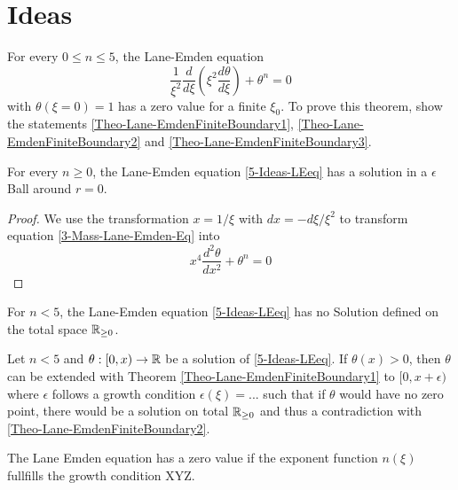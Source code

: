 \section{Ideas}
\begin{theorem}
	\label{Theo-Lane-EmdenFiniteBoundary}
	For every $0\leq n\leq5$, the Lane-Emden equation
	\begin{equation}
		\frac{1}{\xi^2}\frac{d}{d\xi}\left(\xi^2\frac{d\theta}{d\xi}\right)+\theta^n=0
		\label{5-Ideas-LEeq}
	\end{equation}
	with $\theta(\xi=0)=1$ has a zero value for a finite $\xi_0$. To prove this theorem, show the statements \ref{Theo-Lane-EmdenFiniteBoundary1}, 
	\ref{Theo-Lane-EmdenFiniteBoundary2} and \ref{Theo-Lane-EmdenFiniteBoundary3}.
\end{theorem}
\begin{theorem}
	\label{Theo-Lane-EmdenFiniteBoundary1}
	For every $n\geq0$, the Lane-Emden equation \ref{5-Ideas-LEeq} has a solution in a $\epsilon$ Ball around $r=0$.
\end{theorem}
\begin{proof}
	We use the transformation $x=1/\xi$ with $dx=-d\xi/\xi^2$ to transform equation \ref{3-Mass-Lane-Emden-Eq} into
	\begin{equation}
		x^4\frac{d^2\theta}{dx^2} + \theta^n=0
	\end{equation}

\end{proof}
\begin{theorem}
	\label{Theo-Lane-EmdenFiniteBoundary2}
	For $n<5$, the Lane-Emden equation \ref{5-Ideas-LEeq} has no Solution defined on the total space $\mathbb{R}_{\geq0}$.
\end{theorem}
\begin{theorem}
	\label{Theo-Lane-EmdenFiniteBoundary3}
	Let $n<5$ and $\theta:[0,x)\rightarrow\mathbb{R}$ be a solution of \ref{5-Ideas-LEeq}. If $\theta(x)>0$, then $\theta$ can be extended with Theorem \ref{Theo-Lane-EmdenFiniteBoundary1} 
	to $[0,x+\epsilon)$ where $\epsilon$ follows a growth condition $\epsilon(\xi)=...$ such that if $\theta$ would have no zero point, there would be a solution on total 
	$\mathbb{R}_{\geq0}$ and thus a contradiction with \ref{Theo-Lane-EmdenFiniteBoundary2}.
\end{theorem}
\begin{theorem}
	The Lane Emden equation has a zero value if the exponent function $n(\xi)$ fullfills the growth condition XYZ.
\end{theorem}

